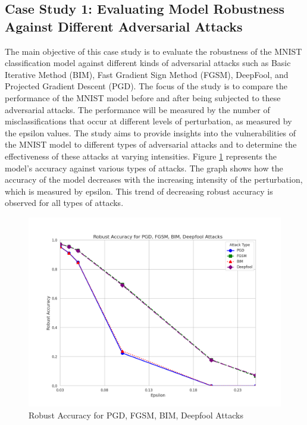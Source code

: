 \documentclass[10pt, conference, a4paper, final]{IEEEtran}
\begin{document}
\subsection{Case Study 1: Evaluating Model Robustness Against Different Adversarial Attacks}
The main objective of this case study is to evaluate the robustness of the MNIST classification model 
against different kinds of adversarial attacks such as Basic Iterative Method (BIM), Fast Gradient Sign Method (FGSM), 
DeepFool, and Projected Gradient Descent (PGD). The focus of the study is to compare the performance of the MNIST model before and after being subjected to these adversarial attacks. The performance will be measured by the number of misclassifications that occur at different levels of perturbation, as measured by the epsilon values. The study aims to provide insights into the vulnerabilities of the MNIST model to different types of adversarial attacks and to determine the effectiveness of these attacks at varying intensities.
Figure \ref {fig:robust_accuracy_attacks} represents the model's accuracy against various types of attacks. 
The graph shows how the accuracy of the model decreases with the increasing intensity of the perturbation, which is measured by epsilon. This trend of decreasing robust accuracy is observed for all types of attacks.



\begin{figure}[ht]
    \centering
    \includegraphics[width=\linewidth]{robust.png}
    \caption{Robust Accuracy for PGD, FGSM, BIM, Deepfool Attacks}
    \label{fig:robust_accuracy_attacks}
\end{figure}
\end{document}
